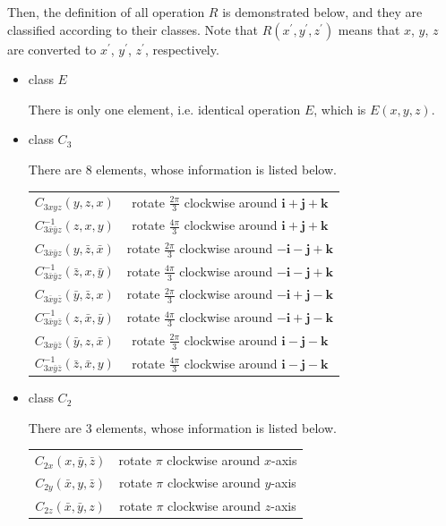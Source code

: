 \documentclass[a4paper]{book}
\begin{document}
\begin{solution}
		Then, the definition of all operation $R$ is demonstrated below, and they are classified according to their classes. Note that $R(x^\prime,y^\prime,z^\prime)$ means that $x$, $y$, $z$ are converted to $x^\prime$, $y^\prime$, $z^\prime$, respectively.
		\begin{itemize}

		\item class $E$
		
		There is only one element, i.e. identical operation $E$, which is $E(x,y,z)$.
		
		\item class $C_3$

		There are 8 elements, whose information is listed below. \vspace{-1em}
		\begin{center}
		\begin{tabular}{c|c} \hline
			$C_{3xyz}(y,z,x)$	& rotate $\frac {2\pi}3$ clockwise around $\bm{i+j+k}$\\
			$C^{-1}_{3\bar x\bar yz}(z,x,y)$ & rotate $\frac {4\pi}3$ clockwise around $\bm{i+j+k}$ \\
			$C_{3\bar x\bar yz}(y,\bar z,\bar x)$ &  rotate $\frac {2\pi}3$ clockwise around $\bm{-i-j+k}$ \\
			$C^{-1}_{3\bar x\bar yz}(\bar z,x,\bar y)$ & rotate $\frac {4\pi}3$ clockwise around $\bm{-i-j+k}$ \\
			$C_{3\bar x y \bar z}(\bar y, \bar z,x)$ &  rotate $\frac {2\pi}3$ clockwise around $\bm{-i+j-k}$ \\
			$C^{-1}_{3\bar x y \bar z}(z, \bar x,\bar y)$ & rotate $\frac {4\pi}3$ clockwise around $\bm{-i+j-k}$ \\
			$C_{3x\bar y \bar z}(\bar y, z,\bar x)$ &  rotate $\frac {2\pi}3$ clockwise around $\bm{i-j-k}$ \\
			$C^{-1}_{3x\bar y \bar z}(\bar z,\bar x,y)$ & rotate $\frac {4\pi}3$ clockwise around $\bm{i-j-k}$ \\ \hline
		\end{tabular}
		\end{center}
		
		\item class $C_2$

		There are 3 elements, whose information is listed below. \vspace{-1em}
		\begin{center}
		\begin{tabular}{c|c} \hline
			$C_{2x}(x,\bar y, \bar z)$	& rotate $\pi$ clockwise around $x$-axis\\
			$C_{2y}(\bar x, y, \bar z)$	& rotate $\pi$ clockwise around $y$-axis\\
			$C_{2z}(\bar x,\bar y, z)$	& rotate $\pi$ clockwise around $z$-axis\\ \hline
		\end{tabular}
		\end{center}
		

\end{itemize}
\end{solution}
\end{document}
